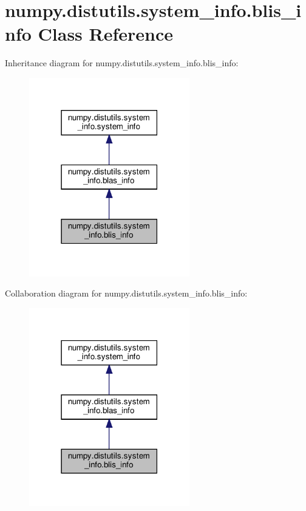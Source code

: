 \hypertarget{classnumpy_1_1distutils_1_1system__info_1_1blis__info}{}\section{numpy.\+distutils.\+system\+\_\+info.\+blis\+\_\+info Class Reference}
\label{classnumpy_1_1distutils_1_1system__info_1_1blis__info}


Inheritance diagram for numpy.\+distutils.\+system\+\_\+info.\+blis\+\_\+info\+:
\nopagebreak
\begin{figure}[H]
\begin{center}
\leavevmode
\includegraphics[width=198pt]{classnumpy_1_1distutils_1_1system__info_1_1blis__info__inherit__graph}
\end{center}
\end{figure}


Collaboration diagram for numpy.\+distutils.\+system\+\_\+info.\+blis\+\_\+info\+:
\nopagebreak
\begin{figure}[H]
\begin{center}
\leavevmode
\includegraphics[width=198pt]{classnumpy_1_1distutils_1_1system__info_1_1blis__info__coll__graph}
\end{center}
\end{figure}
